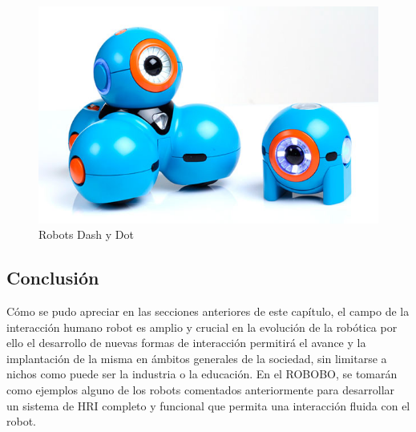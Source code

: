    \begin{figure}
	\centering
	\includegraphics[width=0.6\linewidth]{imagenes/dashanddot.jpg}
	\caption{Robots Dash y Dot}
	\label{fig:dashanddot}
\end{figure} 
 
 
 \subsection{Conclusión}
   
Cómo se pudo apreciar en las secciones anteriores de este capítulo, el campo de la interacción humano robot es amplio y crucial en la evolución de la robótica por ello el desarrollo de nuevas formas de interacción permitirá el avance y la implantación de la misma en ámbitos generales de la sociedad, sin limitarse a nichos como puede ser la industria o la educación.
En el ROBOBO, se tomarán como ejemplos alguno de los robots comentados anteriormente para desarrollar un sistema de HRI completo y funcional que permita una interacción fluida con el robot.

 

   
